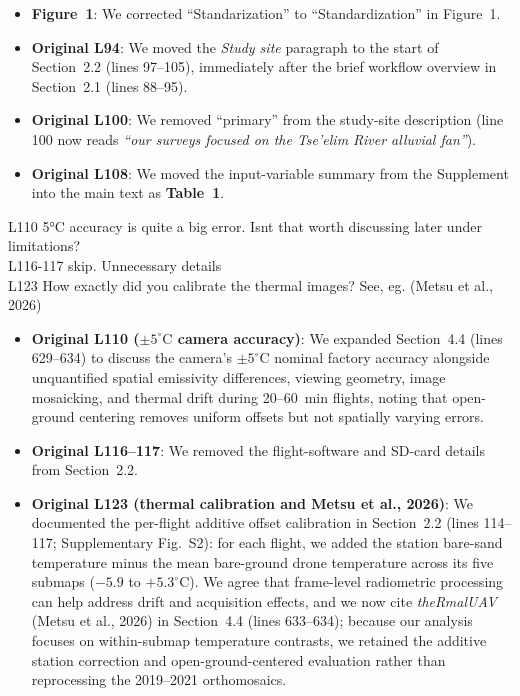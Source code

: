 \documentclass[12pt,english]{reviewresponse}
\begin{document}
\begin{revresponse}
\begin{itemize}[leftmargin=*, itemsep=0.2em]
    \item \textbf{Figure~1}: We corrected ``Standarization'' to ``Standardization'' in Figure~1.
    \item \textbf{Original L94}: We moved the \textit{Study site} paragraph to the start of Section~2.2 (lines 97--105), immediately after the brief workflow overview in Section~2.1 (lines 88--95).
    \item \textbf{Original L100}: We removed ``primary'' from the study-site description (line 100 now reads \textit{``our surveys focused on the Tse'elim River alluvial fan''}).
    \item \textbf{Original L108}: We moved the input-variable summary from the Supplement into the main text as \textbf{Table~1}.
\end{itemize}
\end{revresponse}

\begin{revcomment}
L110 5°C accuracy is quite a big error. Isnt that worth discussing later under limitations?\\
L116-117 skip. Unnecessary details\\
L123 How exactly did you calibrate the thermal images? See, eg. (Metsu et al., 2026)
\end{revcomment}

\begin{revresponse}
\begin{itemize}[leftmargin=*, itemsep=0.2em]
    \item \textbf{Original L110 ($\pm 5^\circ\mathrm{C}$ camera accuracy)}: We expanded Section~4.4 (lines 629--634) to discuss the camera's $\pm 5^\circ\mathrm{C}$ nominal factory accuracy alongside unquantified spatial emissivity differences, viewing geometry, image mosaicking, and thermal drift during 20--60~min flights, noting that open-ground centering removes uniform offsets but not spatially varying errors.
    \item \textbf{Original L116--117}: We removed the flight-software and SD-card details from Section~2.2.
    \item \textbf{Original L123 (thermal calibration and Metsu et al., 2026)}: We documented the per-flight additive offset calibration in Section~2.2 (lines 114--117; Supplementary Fig.~S2): for each flight, we added the station bare-sand temperature minus the mean bare-ground drone temperature across its five submaps ($-5.9$ to $+5.3^\circ\mathrm{C}$). We agree that frame-level radiometric processing can help address drift and acquisition effects, and we now cite \textit{theRmalUAV} (Metsu et al., 2026) in Section~4.4 (lines 633--634); because our analysis focuses on within-submap temperature contrasts, we retained the additive station correction and open-ground-centered evaluation rather than reprocessing the 2019--2021 orthomosaics.
\end{itemize}
\end{revresponse}
\end{document}
